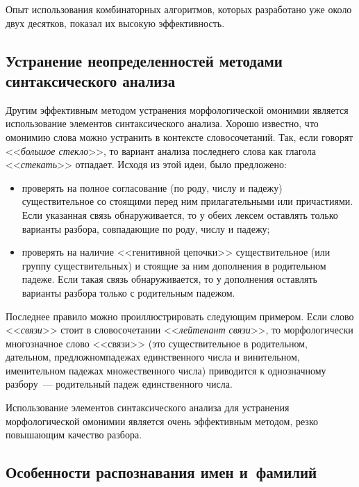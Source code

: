 \begin{multicols}{2}
     Опыт использования комбинаторных алгоритмов, которых разработано 
уже около двух десятков, показал их высокую эффективность.


\subsection{Устранение неопределенностей методами синтаксического 
анализа}
     
     Другим эффективным методом устранения морфологической омонимии 
является использование элементов синтаксического анализа. Хорошо известно, 
что омонимию слова можно устранить в контексте словосочетаний. Так, если 
говорят <<\textit{большое стекло}>>, то вариант анализа последнего слова как 
глагола <<\textit{стекать}>> отпадает. Исходя из этой идеи, было предложено:
     \begin{itemize}
     \item проверять на полное согласование (по роду, чис\-лу и падежу) 
существительное со стоящими перед ним прилагательными или причастиями. 
Если указанная связь обнаруживается, то у обеих лексем оставлять только 
варианты разбора, совпадающие по роду, числу и падежу; 
     \item проверять на наличие <<генитивной цепочки>> 
существительное (или группу существительных) и стоящие за ним дополнения 
в родительном падеже. Если такая связь обнаруживается, то у дополнения 
оставлять варианты разбора только с родительным падежом. 
     \end{itemize}
     
     Последнее правило можно проиллюстрировать следующим примером. 
Если слово <<\textit{связи}>> стоит в\linebreak
словосочетании <<\textit{лейтенант 
связи}>>, то морфологически многозначное слово <<связи>> (это 
существительное в родительном, дательном, предложном\linebreak падежах 
единственного числа и винительном, именительном падежах множественного 
числа) приводится к однозначному разбору~--- родительный падеж 
единственного числа. 
     
     Использование элементов синтаксического анализа для устранения 
морфологической омонимии является очень эффективным методом, резко 
повышающим качество разбора. 

\vspace*{-6pt}

\subsection{Особенности распознавания имен и~фамилий}
     

\end{multicols}
